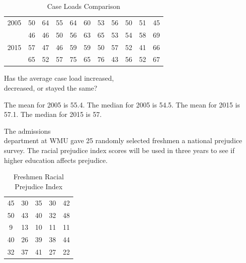 \documentclass[11pt, chapterprefix=true]{scrbook}\usepackage[]{graphicx}\usepackage[]{color}
\begin{document}
\begin{exercises}
\begin{exercise}
\begin{table}[htbp]
   \centering
   \caption{Case Loads Comparison}
   {\tiny{
   \begin{tabular}{@{} ccccccccccc  @{}} \hline %
   2005 & 50&64&55&64&60&53&56&50&51&45 \\ & 46&46&50&56&63&65&53&54&58&69 \\ \hline
   2015 & 57&47&46&59&59&50&57&52&41&66 \\ & 65&52&57&75&65&76&43&56&52&67 \\ \hline
   \end{tabular}
    
   \label{tab:t3_4a}
   }}
\end{table}

  Has the average case load increased, \\ decreased, or stayed the same?

   \vspace{2mm}
  \end{exercise}
  \vspace{2mm}
  \begin{solution} %


The mean for 2005 is 55.4.
The median for 2005 is 54.5.
The mean for 2015 is 57.1.
The median for 2015 is 57.

  \end{solution}

  \begin{exercise} %

  The admissions \\ department at WMU gave 25 randomly selected freshmen a national prejudice survey.  The racial prejudice index scores  will be used in three years to see if higher education affects prejudice.

\begin{table}[htbp]
   \centering
   {\small{
   \caption{Freshmen Racial Prejudice Index}
   \begin{tabular}{@{} ccccc  @{}} \hline %
   45 & 30 & 35 & 30 & 42 \\
   50 & 43 & 40 & 32 & 48 \\
   9  & 13 & 10 & 11 & 11 \\
   40 & 26 & 39 & 38 & 44 \\
   32 & 37 & 41 & 27 & 22 \\ \hline
   \end{tabular}
    
}}
\end{table}
\end{exercise}
\end{exercises}
\end{document}

